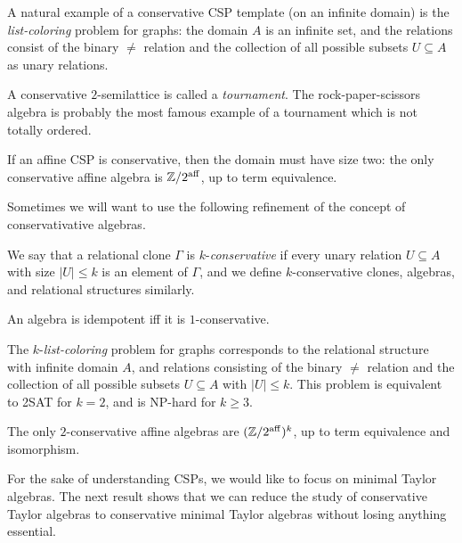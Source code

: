 \documentclass[letterpaper,11pt]{article}
\DeclareMathOperator{\aff}{aff}
\begin{document}
\begin{ex} A natural example of a conservative CSP template (on an infinite domain) is the \emph{list-coloring} problem for graphs: the domain $A$ is an infinite set, and the relations consist of the binary $\ne$ relation and the collection of all possible subsets $U \subseteq A$ as unary relations.
\end{ex}

\begin{ex} A conservative $2$-semilattice is called a \emph{tournament}. The rock-paper-scissors algebra is probably the most famous example of a tournament which is not totally ordered.%
\end{ex}

\begin{ex} If an affine CSP is conservative, then the domain must have size two: the only conservative affine algebra is $\ZZ/2^{\aff}$, up to term equivalence.
\end{ex}

Sometimes we will want to use the following refinement of the concept of conservativative algebras.

\begin{defn} We say that a relational clone $\Gamma$ is $k$-\emph{conservative} if every unary relation $U \subseteq A$ with size $|U| \le k$ is an element of $\Gamma$, and we define $k$-conservative clones, algebras, and relational structures similarly.
\end{defn}

\begin{ex} An algebra is idempotent iff it is $1$-conservative.
\end{ex}

\begin{ex} The $k$-\emph{list-coloring} problem for graphs corresponds to the relational structure with infinite domain $A$, and relations consisting of the binary $\ne$ relation and the collection of all possible subsets $U \subseteq A$ with $|U| \le k$. This problem is equivalent to 2SAT for $k = 2$, and is NP-hard for $k \ge 3$.
\end{ex}

\begin{ex} The only $2$-conservative affine algebras are $(\ZZ/2^{\aff})^k$, up to term equivalence and isomorphism.
\end{ex}

For the sake of understanding CSPs, we would like to focus on minimal Taylor algebras. The next result shows that we can reduce the study of conservative Taylor algebras to conservative minimal Taylor algebras without losing anything essential.
\end{document}
